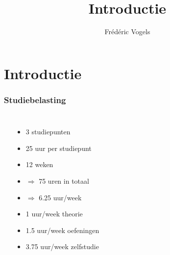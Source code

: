 \documentclass{../khlslides}
\title[Algo1]{Introductie}
\author{Fr\'ed\'eric Vogels}
\newcommand{\segpie}[4][]{
  {
    \newcommand{\segment}[3][]{
      {
        \pgfkeys{/mylib/segpie/inner radius/.get=\innerradius}
        \pgfkeys{/mylib/segpie/outer radius/.get=\outerradius}
        \pgfkeys{/mylib/segpie/fill/.get=\fill}
        \pgfmathparse{##2/##3*360}\let\fromangle\pgfmathresult
        \pgfmathparse{(##2+1)/##3*360}\let\toangle\pgfmathresult
        \draw[thin,fill=\fill] (\fromangle:\innerradius) --
                               (\fromangle:\outerradius) --
                               (\toangle:\outerradius) --
                               (\toangle:\innerradius) --
                               cycle;
      }
    }
    \pgfkeys{/mylib/segpie/.cd,#1}
    \foreach \idx in {#2,...,#3} {\segment{\idx}{#4}};
  }
}
\begin{document}
\maketitle

\section{Introductie}

\frame{ \tableofcontents[currentsection] }

\begin{frame}
  \frametitle{Studiebelasting}
  \begin{columns}
    \begin{center}
    \end{center}
      \begin{itemize}
        \item<1-> 3 studiepunten
        \item<1-> 25 uur per studiepunt
        \item<1-> 12 weken
        \item<1-> $\Rightarrow$ 75 uren in totaal
        \item<1-> $\Rightarrow$ 6.25 uur/week
        \item<2-> {\color{red} 1 uur/week theorie}
        \item<3-> {\color{blue} 1.5 uur/week oefeningen}
        \item<4-> {\color{green} 3.75 uur/week zelfstudie}
      \end{itemize}
  \end{columns}
\end{frame}
\end{document}
